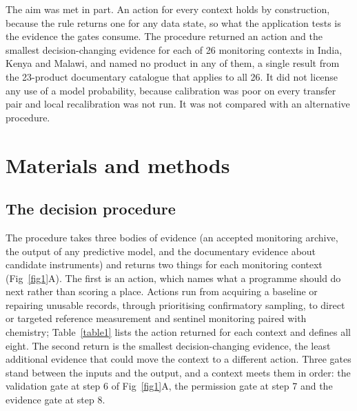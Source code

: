 \documentclass[10pt,letterpaper]{article}
\begin{document}
The aim was met in part. An action for every context holds by construction, because the rule returns one for any data state, so what the application tests is the evidence the gates consume. The procedure returned an action and the smallest decision-changing evidence for each of 26 monitoring contexts in India, Kenya and Malawi, and named no product in any of them, a single result from the 23-product documentary catalogue that applies to all 26. It did not license any use of a model probability, because calibration was poor on every transfer pair and local recalibration was not run. It was not compared with an alternative procedure.

\section*{Materials and methods}

\subsection*{The decision procedure}

The procedure takes three bodies of evidence (an accepted monitoring archive, the output of any predictive model, and the documentary evidence about candidate instruments) and returns two things for each monitoring context (Fig~\ref{fig1}A). The first is an action, which names what a programme should do next rather than scoring a place. Actions run from acquiring a baseline or repairing unusable records, through prioritising confirmatory sampling, to direct or targeted reference measurement and sentinel monitoring paired with chemistry; Table~\ref{table1} lists the action returned for each context and  defines all eight. The second return is the smallest decision-changing evidence, the least additional evidence that could move the context to a different action. Three gates stand between the inputs and the output, and a context meets them in order: the validation gate at step 6 of Fig~\ref{fig1}A, the permission gate at step 7 and the evidence gate at step 8.
\end{document}
